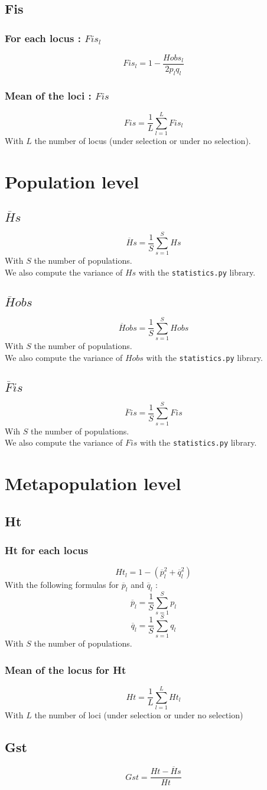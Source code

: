 \documentclass[10pt,a4paper]{article}
\begin{document}
\subsection{Fis}
\subsubsection{For each locus : $Fis_l$}
\[ Fis_l = 1- \frac{Hobs_l}{2p_l q_l}\]
\subsubsection{Mean of the loci : $Fis$}
\[Fis = \frac{1}{L}\sum_{l=1}^L Fis_l\]
With $L$ the number of locus (under selection or under no selection).


\section{Population level}
\subsection{$\overline{H}s$}
\[ \overline{H}s = \frac{1}{S}\sum_{s=1}^S Hs\]
With $S$ the number of populations.\\
We also compute the variance of $Hs$ with the \texttt{statistics.py} library.
\subsection{$\overline{H}obs$}
\[ \overline{H}obs = \frac{1}{S}\sum_{s=1}^S Hobs \]
With $S$ the number of populations.\\
We also compute the variance of $Hobs$ with the \texttt{statistics.py} library.
\subsection{$\overline{F}is$}
\[ \overline{F}is = \frac{1}{S}\sum_{s=1}^S Fis \]
Wih $S$ the number of populations.\\
We also compute the variance of $Fis$ with the \texttt{statistics.py} library.

\section{Metapopulation level}
\subsection{Ht}
\subsubsection{Ht for each locus}
\[ Ht_l = 1-(\overline{p}_l^2 + \overline{q}_l^2) \]
With the following formulas for $\overline{p}_l$ and $\overline{q}_l$ :
\[ \overline{p}_l = \frac{1}{S}\sum_{s=1}^{S} p_l \]
\[ \overline{q}_l = \frac{1}{S}\sum_{s=1}^{S} q_l \]
With $S$ the number of populations.
\subsubsection{Mean of the locus for Ht}
\[ Ht = \frac{1}{L}\sum_{l=1}^{L} Ht_l\]
With $L$ the number of loci (under selection or under no selection)
\subsection{Gst}
\[ Gst = \frac{Ht - \overline{H}s}{Ht} \]
\end{document}

